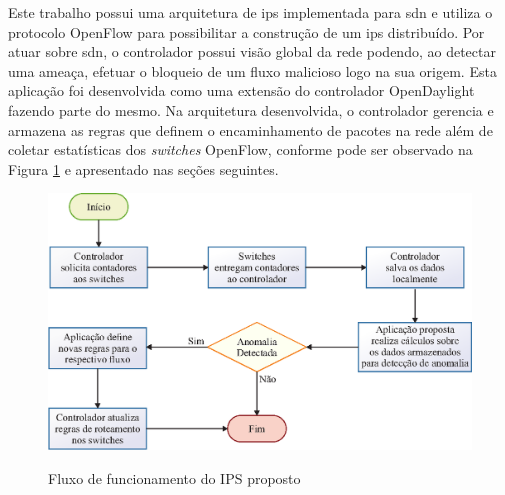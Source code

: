 Este trabalho  possui uma arquitetura de \gls{ips} implementada para \gls{sdn} e utiliza o protocolo OpenFlow para possibilitar a construção de um \gls{ips} distribuído. Por atuar sobre \gls{sdn}, o controlador possui visão global da rede podendo, ao detectar uma ameaça, efetuar o bloqueio de um fluxo malicioso logo na sua origem.
Esta aplicação foi desenvolvida como uma extensão do controlador OpenDaylight \cite{website:odl} fazendo parte do mesmo. 
Na arquitetura desenvolvida, o controlador gerencia e armazena as regras que definem o encaminhamento de pacotes na rede além de coletar estatísticas dos \textit{switches} OpenFlow, conforme pode ser observado na Figura \ref{fig:arch-proposta} e apresentado nas seções seguintes.

\begin{figure}
  \centering
  \caption{Fluxo de funcionamento do IPS proposto}
  \includegraphics[width=.90\textwidth]{images/fluxo-arq.eps}
  \label{fig:arch-proposta}
\end{figure}

\FloatBarrier




